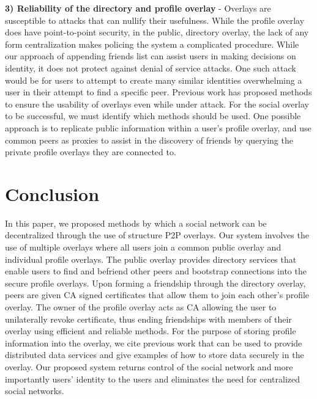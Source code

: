 \documentclass[letterpaper,twocolumn,10pt]{article}
\begin{document}
{\bf 3) Reliability of the directory and profile overlay} - Overlays are
susceptible to attacks that can nullify their usefulness.  While
the profile overlay does have point-to-point security, in the public,
directory overlay, the lack of any form centralization makes policing the system
a complicated procedure.  While our approach of appending friends list can assist
users in making decisions on identity, it does not protect against denial of
service attacks.  One such attack would be for users to attempt to create many
similar identities overwhelming a user in their attempt to find a specific peer.
Previous work has proposed methods to ensure the usability of overlays even
while under attack.  For the social overlay to be successful, we must identify
which methods should be used. One possible approach is to replicate public
information within a user's profile overlay, and use common peers as proxies to assist 
in the discovery of friends by querying the private profile overlays they are
connected to.

\section{Conclusion}
\label{conclusion}
In this paper, we proposed methods by which a social network can be
decentralized through the use of structure P2P overlays.  Our system involves
the use of multiple overlays where all users join a common public overlay and
individual profile overlays.  The public overlay provides directory services
that enable users to find and befriend other peers and bootstrap connections
into the secure profile overlays.  Upon forming a friendship through the
directory overlay, peers are given CA signed certificates that allow them to
join each other's profile overlay.  The owner of the profile overlay acts as
CA allowing the user to unilaterally revoke certificate, thus ending
friendships with members of their overlay using efficient and reliable methods.
For the purpose of storing profile information into the overlay, we cite
previous work that can be used to provide distributed data services and give
examples of how to store data securely in the overlay.  Our proposed system
returns control of the social network and more importantly users' identity to
the users and eliminates the need for centralized social networks.


\footnotesize{

\suppressfloats
}
\end{document}
